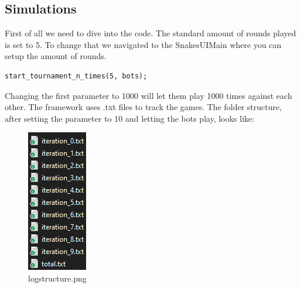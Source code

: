 \documentclass[a4paper,12pt]{article}
\begin{document}
\subsection{Simulations}
First of all we need to dive into the code. The standard amount of rounds played is set to 5. To change that we navigated to the SnakesUIMain where you can setup the amount of rounds.
\begin{verbatim}
start_tournament_n_times(5, bots);
\end{verbatim}
Changing the first parameter to 1000 will let them play 1000 times against each other. The framework uses .txt files to track the games. The folder structure, after setting the parameter to 10 and letting the bots play, looks like:
\begin{figure}[H]
    \centering
    \includegraphics[scale=0.8]{logs_structure}
\caption{logstructure.png}
    \label{fig:logs_structure.png}
\end{figure}
\end{document}

